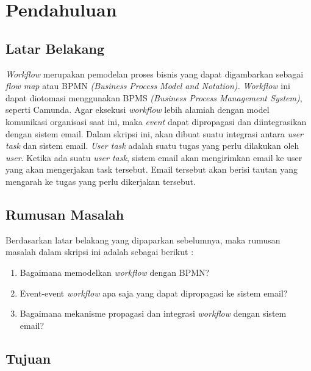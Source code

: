 \chapter{Pendahuluan}
\label{chap:intro}
   
\section{Latar Belakang}
\label{sec:label}

\textit{Workflow} merupakan pemodelan proses bisnis yang dapat digambarkan sebagai \textit{flow map} atau BPMN \textit{(Business Process Model and Notation).} \textit{Workflow} ini dapat diotomasi menggunakan BPMS \textit{(Business Process Management System)}, seperti Camunda. Agar eksekusi \textit{workflow} lebih alamiah dengan model komunikasi organisasi saat ini, maka \textit{event} dapat dipropagasi dan diintegrasikan dengan sistem email. 
Dalam skripsi ini, akan dibuat suatu integrasi antara \textit{user task} dan sistem email. \textit{User task} adalah suatu tugas yang perlu dilakukan oleh \textit{user}. Ketika ada suatu \textit{user task}, sistem email akan mengirimkan email ke user yang akan mengerjakan task tersebut. Email tersebut akan berisi tautan yang mengarah ke tugas yang perlu dikerjakan tersebut.





\section{Rumusan Masalah}
\label{sec:rumusan}

Berdasarkan latar belakang yang dipaparkan sebelumnya, maka rumusan masalah dalam skripsi ini adalah sebagai berikut :
\begin{enumerate}
	\item Bagaimana memodelkan \textit{workflow} dengan BPMN?
	\item Event-event \textit{workflow} apa saja yang dapat dipropagasi ke sistem email?
	\item Bagaimana mekanisme propagasi dan integrasi \textit{workflow} dengan sistem email?
\end{enumerate} 




\section{Tujuan}
\label{sec:tujuan}

